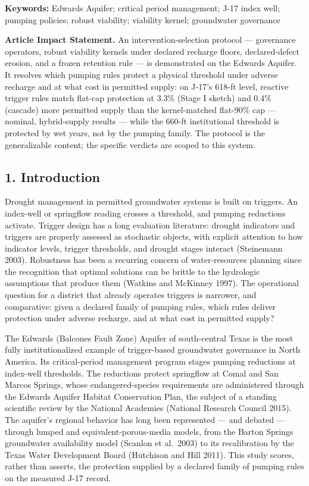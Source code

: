\textbf{Keywords:} Edwards Aquifer; critical period management; J-17
index well; pumping policies; robust viability; viability kernel;
groundwater governance

\textbf{Article Impact Statement.} An intervention-selection protocol
--- governance operators, robust viability kernels under declared
recharge floors, declared-defect erosion, and a frozen retention rule
--- is demonstrated on the Edwards Aquifer. It resolves which pumping
rules protect a physical threshold under adverse recharge and at what
cost in permitted supply: on J-17's 618-ft level, reactive trigger rules
match flat-cap protection at 3.3\% (Stage I sketch) and 0.4\% (cascade)
more permitted supply than the kernel-matched flat-90\% cap --- nominal,
hybrid-supply results --- while the 660-ft institutional threshold is
protected by wet years, not by the pumping family. The protocol is the
generalizable content; the specific verdicts are scoped to this system.

\subsection{1. Introduction}\label{edw-introduction}

Drought management in permitted groundwater systems is built on
triggers. An index-well or springflow reading crosses a threshold, and
pumping reductions activate. Trigger design has a long evaluation
literature: drought indicators and triggers are properly assessed as
stochastic objects, with explicit attention to how indicator levels,
trigger thresholds, and drought stages interact (Steinemann 2003).
Robustness has been a recurring concern of water-resources planning
since the recognition that optimal solutions can be brittle to the
hydrologic assumptions that produce them (Watkins and McKinney 1997).
The operational question for a district that already operates triggers
is narrower, and comparative: given a declared family of pumping rules,
which rules deliver protection under adverse recharge, and at what cost
in permitted supply?

The Edwards (Balcones Fault Zone) Aquifer of south-central Texas is the
most fully institutionalized example of trigger-based groundwater
governance in North America. Its critical-period management program
stages pumping reductions at index-well thresholds. The reductions
protect springflow at Comal and San Marcos Springs, whose
endangered-species requirements are administered through the Edwards
Aquifer Habitat Conservation Plan, the subject of a standing scientific
review by the National Academies (National Research Council 2015). The
aquifer's regional behavior has long been represented --- and debated
--- through lumped and equivalent-porous-media models, from the Barton
Springs groundwater availability model (Scanlon et al.~2003) to its
recalibration by the Texas Water Development Board (Hutchison and Hill
2011). This study scores, rather than asserts, the protection supplied
by a declared family of pumping rules on the measured J-17 record.

